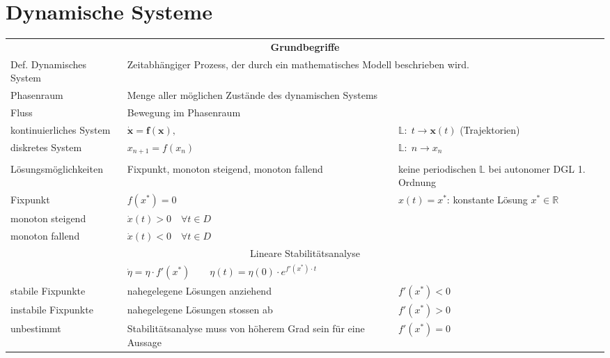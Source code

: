 \section{Dynamische Systeme}

\begin{tabularx}{\columnwidth}{p{3cm}XX}
	\hline 
	\multicolumn{3}{c}{\textbf{Grundbegriffe}}\\
	\hdashline 
	
	Def. Dynamisches System & 
	\multicolumn{2}{l}{Zeitabhängiger Prozess, der durch ein mathematisches Modell beschrieben wird.}\\
	Phasenraum & \multicolumn{2}{l}{Menge aller möglichen Zustände des dynamischen Systems}\\
	Fluss & Bewegung im Phasenraum\\
	kontinuierliches System & $\bm \dot x = \bm f(\bm x), $ & $\mathbb{L}:\; t \to \bm x(t)$ (Trajektorien)\\
	diskretes System & $x_{n+1} = f(x_n)$ &  $\mathbb{L}:\; n\to x_n$\\
	\hdashline 
	\multicolumn{3}{c}{\textbf{Eindimensionale Systeme}}\\
	Lösungsmöglichkeiten & Fixpunkt, monoton steigend, monoton fallend & keine periodischen $\mathbb L$ bei autonomer DGL 1. Ordnung\\
	Fixpunkt & $f(x^*) = 0$  & $x(t) = x^*$: konstante Lösung $x^*\in \mathbb{R}$\\
	monoton steigend & $\dot x(t) > 0 \quad\forall t\in D$ & \\
	monoton fallend & $\dot x(t) < 0 \quad \forall t\in D$ & \\

	\multicolumn{3}{c}{Lineare Stabilitätsanalyse}\\
	& $\dot \eta = \eta \cdot f'(x^*) \qquad \eta(t) = \eta(0)\cdot e^{f'(x^*)\cdot t}$ & \\
	stabile Fixpunkte & nahegelegene Lösungen anziehend & $f'(x^*) < 0$\\
	instabile Fixpunkte & nahegelegene Lösungen stossen ab & $f'(x^*) > 0$\\
	unbestimmt & Stabilitätsanalyse muss von höherem Grad sein für eine Aussage& $f'(x^*) = 0$ \\

	 \hline 
	 

\end{tabularx}

